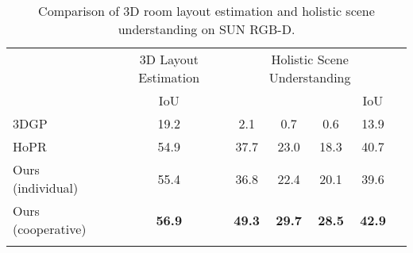 \documentclass{article}
\begin{document}
\begin{table}[t!]
    \caption{Comparison of 3D room layout estimation and holistic scene understanding on SUN RGB-D.}
    \setlength{\tabcolsep}{4pt}
    \centering
    \begin{tabular}{l|c| c c c c c}
        \Xhline{2\arrayrulewidth}
        \multirow{2}{*}{Method} & \multicolumn{1}{c||}{3D Layout Estimation} & \multicolumn{4}{c}{Holistic Scene Understanding} \\
         & IoU &  &  &  & IoU \\
        \hline
        3DGP \citep{choi2013understanding}  & 19.2 & 2.1 & 0.7 & 0.6 & 13.9 \\
        HoPR \citep{huang2018holistic}  & 54.9 & 37.7 & 23.0 & 18.3 & 40.7 \\
        Ours (individual)  & 55.4 & 36.8 & 22.4 & 20.1 & 39.6\\
        Ours (cooperative)  & \textbf{56.9} & \textbf{49.3} & \textbf{29.7} & \textbf{28.5} & \textbf{42.9} \\
        \Xhline{2\arrayrulewidth}
    \end{tabular}
    \label{tab:holistic}
\end{table} 
\begin{table}[t!]
    \caption{Comparisons of 3D object detection on SUN RGB-D.}
    \setlength{\tabcolsep}{4pt}
    \centering
    \label{tab:detection}
\end{table}
\end{document}
